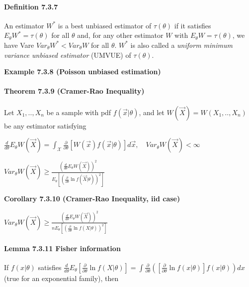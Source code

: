 \documentclass[6pt,twocolumn,Portrait]{article}
\let\oldparagraph\paragraph
\renewcommand{\paragraph}[1]{\oldparagraph{#1}\mbox{}}
\begin{document}
\hypertarget{UMVUE}{%
\paragraph{\texorpdfstring{\textbf{Definition
7.3.7}}{Definition 7.3.7}}\label{UMVUE}}

An estimator \(W^*\) is a best unbiased estimator of \(\tau(\theta)\) if
it satisfies \(E_\theta{W^*}=\tau(\theta)\) for all \(\theta\) and, for
any other estimator \(W\) with \(E_\theta{W}=\tau(\theta)\), we have
Vare \(Var_\theta{W^*}<Var_\theta{W}\) for all \(\theta\). \(W^*\) is
also called a \emph{uniform minimum variance unbiased estimator} (UMVUE)
of \(\tau(\theta)\).

\textbf{Example 7.3.8 (Poisson unbiased estimation)}

\hypertarget{CRLB}{%
\paragraph{\texorpdfstring{\textbf{Theorem 7.3.9 (Cramer-Rao
Inequality)}}{Theorem 7.3.9 (Cramer-Rao Inequality)}}\label{CRLB}}

Let \(X_1,..,X_n\) be a sample with pdf \(f(\vec x|\theta)\), and let
\(W(\vec X)=W(X_1,..,X_n)\) be any estimator satisfying

\(\frac{d}{d\theta}E_\theta W(\vec X)=\int_{\mathcal{X}}\frac{\partial}{\partial\theta}\left[W(\vec x)f(\vec x|\theta)\right]d\vec x,\quad Var_\theta W(\vec X)<\infty\)

\(Var_\theta W(\vec X)\ge\frac{(\frac{d}{d\theta}E_\theta W(\vec X))^2}{E_\theta\left[(\frac{\partial}{\partial\theta}\ln f(\vec X|\theta))^2\right]}\)

\textbf{Corollary 7.3.10 (Cramer-Rao Inequality, iid case)}

\(Var_\theta W(\vec X)\ge\frac{(\frac{d}{d\theta}E_\theta W(\vec X))^2}{nE_\theta\left[(\frac{\partial}{\partial\theta}\ln f(X|\theta))^2\right]}\)

\hypertarget{FishI}{%
\paragraph{\texorpdfstring{\textbf{Lemma 7.3.11 Fisher
information}}{Lemma 7.3.11 Fisher information}}\label{FishI}}

If \(f(x|\theta)\) satisfies
\(\frac{d}{d\theta}E_\theta\left[\frac{\partial}{\partial\theta}\ln f(X|\theta)\right]=\int\frac{\partial}{\partial\theta}\left(\left[\frac{\partial}{\partial\theta}\ln f(x|\theta)\right]f(x|\theta)\right)dx\)
(true for an exponential family), then
\end{document}
